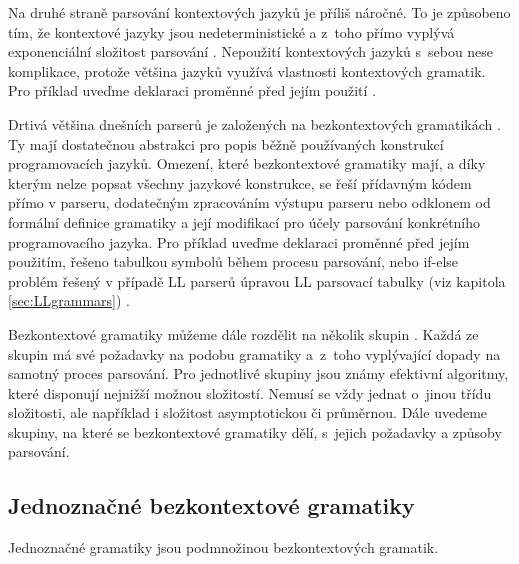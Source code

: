 		Na druhé straně parsování kontextových jazyků je příliš náročné. To je způsobeno tím, že kontextové jazyky jsou nedeterministické a z~toho přímo vyplývá exponenciální složitost parsování \cite{DBLP:journals/corr/LaurentM16}. Nepoužití kontextových jazyků s~sebou nese komplikace, protože většina jazyků využívá vlastnosti kontextových gramatik. Pro příklad uveďme deklaraci proměnné před jejím použití \cite{Lai2008}.
		
		Drtivá většina dnešních parserů je založených na bezkontextových gramatikách \cite{Sikkel1997}. Ty mají dostatečnou abstrakci pro popis běžně používaných konstrukcí programovacích jazyků. Omezení, které bezkontextové gramatiky mají, a díky kterým nelze popsat všechny jazykové konstrukce, se řeší přídavným kódem přímo v parseru, dodatečným zpracováním výstupu parseru nebo odklonem od formální definice gramatiky a její modifikací pro účely parsování konkrétního programovacího jazyka. Pro příklad uveďme deklaraci proměnné před jejím použitím, řešeno tabulkou symbolů během procesu parsování, nebo if-else problém \cite{Abrahams:1966:FSD:365813.365821} řešený v případě LL parserů úpravou LL parsovací tabulky (viz kapitola \ref{sec:LLgrammars}) \cite{Aho:1986:CPT:6448}.
		
		\vspace{1em}
		
		Bezkontextové gramatiky můžeme dále rozdělit na několik skupin \cite{Meduna:2014:FLC:2636678}.
		Kaž\-dá ze skupin má své požadavky na podobu gramatiky a~z~toho vyplývající dopady na samotný proces parsování. Pro jednotlivé skupiny jsou známy efektivní algoritmy, které disponují nejnižší možnou složitostí. Nemusí se vždy jednat o~jinou třídu složitosti, ale například i složitost asymptotickou či průměrnou. Dále uvedeme skupiny, na které se bezkontextové gramatiky dělí, s~jejich požadavky a způsoby parsování.
		
		\subsection{Jednoznačné bezkontextové gramatiky}
			Jednoznačné gramatiky jsou podmnožinou bezkontextových gramatik.
